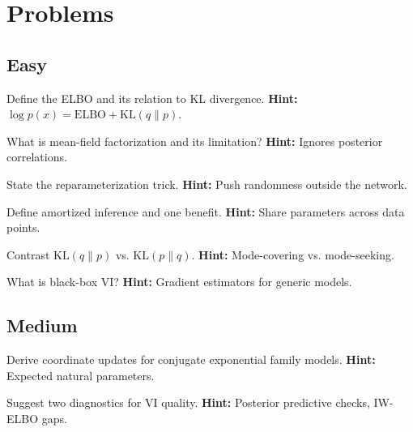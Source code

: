 
\section*{Problems}

\subsection*{Easy}
\begin{problem}[ELBO]
Define the ELBO and its relation to KL divergence.
\textbf{Hint:} $\log p(x) = \text{ELBO} + \mathrm{KL}(q\|p)$.
\end{problem}

\begin{problem}
What is mean-field factorization and its limitation?
\textbf{Hint:} Ignores posterior correlations.
\end{problem}

\begin{problem}[Reparameterization]
State the reparameterization trick.
\textbf{Hint:} Push randomness outside the network.
\end{problem}

\begin{problem}[Amortization]
Define amortized inference and one benefit.
\textbf{Hint:} Share parameters across data points.
\end{problem}

\begin{problem}[KL Direction]
Contrast $\mathrm{KL}(q\|p)$ vs. $\mathrm{KL}(p\|q)$.
\textbf{Hint:} Mode-covering vs. mode-seeking.
\end{problem}

\begin{problem}
What is black-box VI?
\textbf{Hint:} Gradient estimators for generic models.
\end{problem}

\subsection*{Medium}
\begin{problem}[CAVI]
Derive coordinate updates for conjugate exponential family models.
\textbf{Hint:} Expected natural parameters.
\end{problem}

\begin{problem}[Diagnostics]
Suggest two diagnostics for VI quality.
\textbf{Hint:} Posterior predictive checks, IW-ELBO gaps.
\end{problem}

